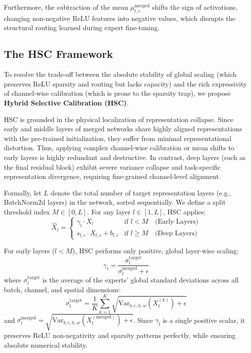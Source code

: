 \documentclass{article}
\begin{document}
Furthermore, the subtraction of the mean $\mu^{\text{merged}}_{l,c}$ shifts the sign of activations, changing non-negative ReLU features into negative values, which disrupts the structural routing learned during expert fine-tuning.

\subsection{The HSC Framework}
To resolve the trade-off between the absolute stability of global scaling (which preserves ReLU sparsity and routing but lacks capacity) and the rich expressivity of channel-wise calibration (which is prone to the sparsity trap), we propose \textbf{Hybrid Selective Calibration (HSC)}.

HSC is grounded in the physical localization of representation collapse. Since early and middle layers of merged networks share highly aligned representations with the pre-trained initialization, they suffer from minimal representational distortion. Thus, applying complex channel-wise calibration or mean shifts to early layers is highly redundant and destructive. In contrast, deep layers (such as the final residual block) exhibit severe variance collapse and task-specific representation divergence, requiring fine-grained channel-level alignment.

Formally, let $L$ denote the total number of target representation layers (e.g., BatchNorm2d layers) in the network, sorted sequentially. We define a split threshold index $M \in [0, L]$. For any layer $l \in [1, L]$, HSC applies:
\begin{equation}
\hat{X}_l = \begin{cases}
\gamma_l \cdot X_l & \text{if } l < M \quad \text{(Early Layers)} \\
s_{l,c} \cdot X_{l,c} + b_{l,c} & \text{if } l \ge M \quad \text{(Deep Layers)}
\end{cases}
\end{equation}

For early layers ($l < M$), HSC performs only positive, global layer-wise scaling:
\begin{equation}
\gamma_l = \frac{\sigma^{\text{target}}_l}{\sigma^{\text{merged}}_l + \epsilon}
\end{equation}
where $\sigma^{\text{target}}_l$ is the average of the experts' global standard deviations across all batch, channel, and spatial dimensions:
\begin{equation}
\sigma^{\text{target}}_l = \frac{1}{K} \sum_{k=1}^K \sqrt{\text{Var}_{b,c,h,w}(X_l^{(k)}) + \epsilon}
\end{equation}
and $\sigma^{\text{merged}}_l = \sqrt{\text{Var}_{b,c,h,w}(X_l^{(\text{merged})}) + \epsilon}$. Since $\gamma_l$ is a single positive scalar, it preserves ReLU non-negativity and sparsity patterns perfectly, while ensuring absolute numerical stability.
\end{document}
